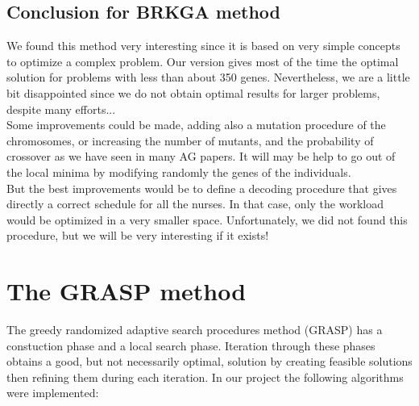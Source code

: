 \documentclass[11pt]{article}
\begin{document}
\subsection{Conclusion for BRKGA method}
We found this method very interesting since it is based on very simple concepts to optimize a complex problem. Our version gives most of the time the optimal solution for problems with less than about 350 genes. Nevertheless, we are a little bit disappointed since we do not obtain optimal results for larger problems, despite many efforts...  \\
Some improvements could be made, adding also a mutation procedure of the chromosomes, or increasing the number of mutants, and the probability of crossover as we have seen in many AG papers. It will may be help to go out of the local minima by modifying  randomly the genes of the individuals. \\
But the best improvements would be to define a decoding procedure that gives directly a correct schedule for all the nurses. In that case, only the workload would be optimized in a very smaller space. Unfortunately, we did not found this procedure, but we will be very interesting if it exists!


\section{The GRASP method}
The greedy randomized adaptive search procedures method (GRASP) has a constuction phase and a local search phase. Iteration through these phases obtains a good, but not necessarily optimal, solution by creating feasible solutions then refining them during each iteration.
In our project the following algorithms were implemented:\\
\end{document}
